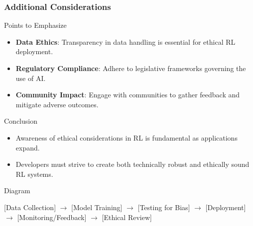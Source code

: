 \documentclass[aspectratio=169]{beamer}
\begin{document}
\begin{frame}[fragile]
    \frametitle{Additional Considerations}
    
    \begin{block}{Points to Emphasize}
        \begin{itemize}
            \item \textbf{Data Ethics}: Transparency in data handling is essential for ethical RL deployment.
            \item \textbf{Regulatory Compliance}: Adhere to legislative frameworks governing the use of AI.
            \item \textbf{Community Impact}: Engage with communities to gather feedback and mitigate adverse outcomes.
        \end{itemize}
    \end{block}

    \begin{block}{Conclusion}
        \begin{itemize}
            \item Awareness of ethical considerations in RL is fundamental as applications expand.
            \item Developers must strive to create both technically robust and ethically sound RL systems.
        \end{itemize}
    \end{block}
    
    \begin{block}{Diagram}
        \begin{center}
            [Data Collection] $\to$ [Model Training] $\to$ [Testing for Bias] $\to$ [Deployment] $\to$ [Monitoring/Feedback] $\to$ [Ethical Review]
        \end{center}
    \end{block}
\end{frame}
\end{document}
